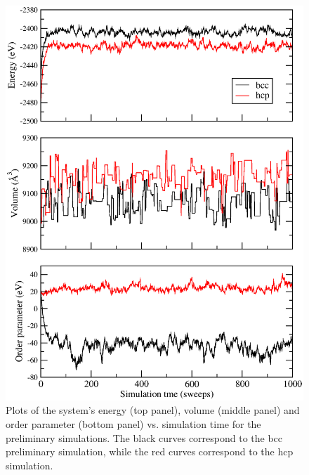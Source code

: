 \documentclass{report}
\begin{document}
\begin{figure}
\centering
\includegraphics[width=\textwidth]{preliminary_results}
\caption
{Plots of the system's energy (top panel), volume (middle panel) and order parameter (bottom panel) vs. simulation time for the preliminary simulations.
The black curves correspond to the bcc preliminary simulation, while the red curves correspond to the hcp simulation.}
\label{fig:preliminary_results}
\end{figure}
\end{document}
